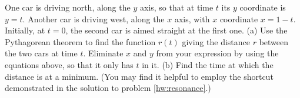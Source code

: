 One car is driving north, along the $y$ axis, so that at time
$t$ its $y$ coordinate is $y=t$. Another car is driving west,
along the $x$ axis, with $x$ coordinate $x=1-t$. Initially,
at $t=0$, the second car is aimed straight at the first one.\hwendpart
(a) Use the Pythagorean theorem to find the function $r(t)$ giving the distance $r$ between
the two cars at time $t$. Eliminate $x$ and $y$ from your expression
by using the equations above, so that it only has $t$ in it.\answercheck\hwendpart
(b) Find the time at which the distance is at a minimum. (You may find it helpful
to employ the shortcut demonstrated in the solution to problem \ref{hw:resonance}.)\answercheck\hwendpart
